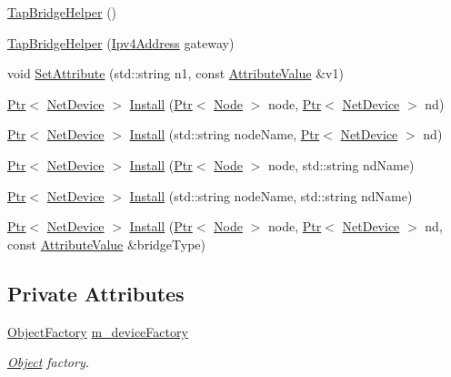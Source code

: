 \begin{DoxyCompactItemize}
\item 
\hyperlink{classns3_1_1TapBridgeHelper_a70bdb3f25b96c168408fdaaf8f00fe59}{Tap\+Bridge\+Helper} ()
\item 
\hyperlink{classns3_1_1TapBridgeHelper_a8412daa9e9e77fdc5e293d47ddea9cc8}{Tap\+Bridge\+Helper} (\hyperlink{classns3_1_1Ipv4Address}{Ipv4\+Address} gateway)
\item 
void \hyperlink{classns3_1_1TapBridgeHelper_ac13f757f82c0ee66504693ede7230397}{Set\+Attribute} (std\+::string n1, const \hyperlink{classns3_1_1AttributeValue}{Attribute\+Value} \&v1)
\item 
\hyperlink{classns3_1_1Ptr}{Ptr}$<$ \hyperlink{classns3_1_1NetDevice}{Net\+Device} $>$ \hyperlink{classns3_1_1TapBridgeHelper_a3bc88e67e28990845ce6cab3e7cafd6e}{Install} (\hyperlink{classns3_1_1Ptr}{Ptr}$<$ \hyperlink{classns3_1_1Node}{Node} $>$ node, \hyperlink{classns3_1_1Ptr}{Ptr}$<$ \hyperlink{classns3_1_1NetDevice}{Net\+Device} $>$ nd)
\item 
\hyperlink{classns3_1_1Ptr}{Ptr}$<$ \hyperlink{classns3_1_1NetDevice}{Net\+Device} $>$ \hyperlink{classns3_1_1TapBridgeHelper_a813ebf442d5e4a68e906a3ef1000d598}{Install} (std\+::string node\+Name, \hyperlink{classns3_1_1Ptr}{Ptr}$<$ \hyperlink{classns3_1_1NetDevice}{Net\+Device} $>$ nd)
\item 
\hyperlink{classns3_1_1Ptr}{Ptr}$<$ \hyperlink{classns3_1_1NetDevice}{Net\+Device} $>$ \hyperlink{classns3_1_1TapBridgeHelper_a48475c36454bc0422fbb8f02dd2d234a}{Install} (\hyperlink{classns3_1_1Ptr}{Ptr}$<$ \hyperlink{classns3_1_1Node}{Node} $>$ node, std\+::string nd\+Name)
\item 
\hyperlink{classns3_1_1Ptr}{Ptr}$<$ \hyperlink{classns3_1_1NetDevice}{Net\+Device} $>$ \hyperlink{classns3_1_1TapBridgeHelper_abffb6c570c321a329c4e7045aa811cc9}{Install} (std\+::string node\+Name, std\+::string nd\+Name)
\item 
\hyperlink{classns3_1_1Ptr}{Ptr}$<$ \hyperlink{classns3_1_1NetDevice}{Net\+Device} $>$ \hyperlink{classns3_1_1TapBridgeHelper_a9a9ad0612d3dbee6f7b9bd4c409daab2}{Install} (\hyperlink{classns3_1_1Ptr}{Ptr}$<$ \hyperlink{classns3_1_1Node}{Node} $>$ node, \hyperlink{classns3_1_1Ptr}{Ptr}$<$ \hyperlink{classns3_1_1NetDevice}{Net\+Device} $>$ nd, const \hyperlink{classns3_1_1AttributeValue}{Attribute\+Value} \&bridge\+Type)
\end{DoxyCompactItemize}
\subsection*{Private Attributes}
\begin{DoxyCompactItemize}
\item 
\hyperlink{classns3_1_1ObjectFactory}{Object\+Factory} \hyperlink{classns3_1_1TapBridgeHelper_af0c52ee5ae87f28a028f7b876681b75d}{m\+\_\+device\+Factory}
\begin{DoxyCompactList}\small\item\em \hyperlink{classns3_1_1Object}{Object} factory. \end{DoxyCompactList}\end{DoxyCompactItemize}


